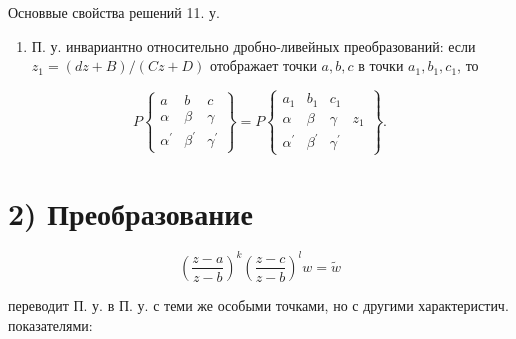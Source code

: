 \documentclass[10pt]{article}
\begin{document}
Основвые свойства решений 11. у.



\begin{enumerate}

  \item П. у. инвариантно относительно дробно-ливейных преобразований: если $z_{1}=(d z+B) /(C z+D)$ отображает точки $a, b, c$ в точки $a_{1}, b_{1}, c_{1}$, то

\end{enumerate}



\[

P\left\{\begin{array}{lll}

a & b & c \\

\alpha & \beta & \gamma \\

\alpha^{\prime} & \beta^{\prime} & \gamma^{\prime}

\end{array}\right\}=P\left\{\begin{array}{llll}

a_{1} & b_{1} & c_{1} \\

\alpha & \beta & \gamma & z_{1} \\

\alpha^{\prime} & \beta^{\prime} & \gamma^{\prime}

\end{array}\right\} .

\]



\section{2) Преобразование}

\[

\left(\frac{z-a}{z-b}\right)^{k}\left(\frac{z-c}{z-b}\right)^{l} w=\tilde{w}

\]



переводит П. у. в П. у. с теми же особыми точками, но с другими характеристич. показателями:
\end{document}
